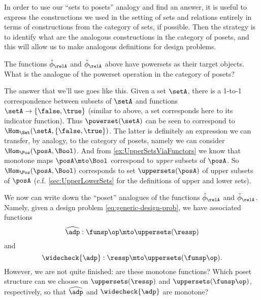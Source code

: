 In order to use our ``sets to posets'' analogy and find an answer, it is useful to express the constructions we used in the setting of sets and relations entirely in terms of constructions from the category of sets, if possible. Then the strategy is to identify what are the analogous constructions in the category of posets, and this will allow us to make analogous definitions for design problems. 

The functions $\hat \phi_{\relA}$ and $\check \phi_{\relA}$ above have powersets as their target objects. What is the analogue of the powerset operation in the category of posets? 

The answer that we'll use goes like this. Given a set $\setA$, there is a 1-to-1 correspondence between subsets of $\setA$ and functions $\setA \to \{ \false, \true \}$ (similar to above, a set corresponds here to its indicator function). Thus $\powerset (\setA)$ can be seen to correspond to $\Hom_{\Set}(\setA, \{ \false, \true\})$. The latter is definitely an expression we can transfer, by analogy, to the category of posets, namely we can consider $\Hom_{\Pos}(\posA, \Bool)$. And from \cref{ex:UpperSetsViaFunctors} we know that monotone maps $\posA \mto \Bool$ correspond to \emph{upper} subsets of $\posA$. So $\Hom_{\Pos}(\posA, \Bool)$ corresponds to set $\uppersets (\posA)$ of upper subsets of $\posA$ (c.f. \cref{sec:UpperLowerSets} for the definitions of upper and lower sets). 

We now can write down the ``poset'' analogues of the functions $\hat \phi_{\relA}$ and $\check \phi_{\relA}$. Namely, given a design problem \cref{eq:generic-design-prob}, we have associated functions 
\begin{equation}\label{eq:dp-left-curry}
\widehat{\adp} : \funsp\op \mto \uppersets (\ressp)
\end{equation}
and 
\begin{equation}\label{eq:dp-right-curry}
\widecheck{\adp} : \ressp \mto \uppersets (\funsp\op).
\end{equation}
However, we are not quite finished: are these monotone functions? Which poset structure can we choose on $\uppersets (\ressp)$ and $\uppersets (\funsp\op)$, respectively, so that $\widehat{\adp}$ and $\widecheck{\adp}$ are monotone?

